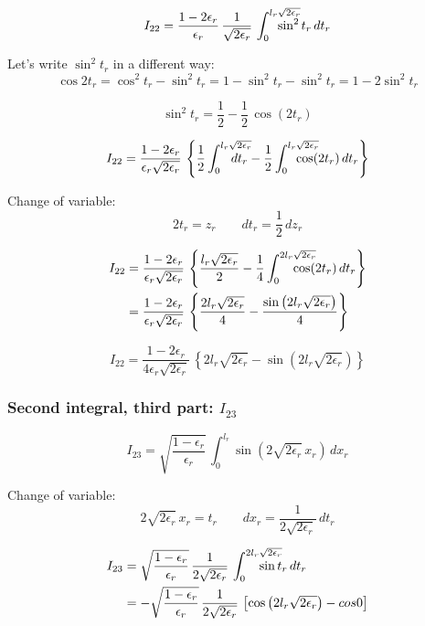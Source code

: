 \[
I_{22}
= 
\frac{1-2\epsilon_r}{\epsilon_r}\,
\frac{1}{\sqrt{2\epsilon_r}}\,
\int_{0}^{l_r\sqrt{2\epsilon_r}}\hspace*{-2em}\sin^2 t_r\, dt_r
\]

Let's write $\sin^2 t_r$ in a different way:
\[
\cos 2t_r = \cos^2 t_r - \sin^2 t_r = 1-\sin^2 t_r - \sin^2 t_r
= 1-2\sin^2 t_r
\]

\[
\sin^2 t_r = \frac{1}{2} - \frac{1}{2}\,\cos (2t_r)
\]

\[
I_{22}
= 
\frac{1-2\epsilon_r}{\epsilon_r\sqrt{2\epsilon_r}}\,
\left\lbrace
\frac{1}{2}\int_{0}^{l_r\sqrt{2\epsilon_r}}\hspace*{-2em}\,dt_r
- \frac{1}{2}\int_{0}^{l_r\sqrt{2\epsilon_r}}\hspace*{-2em}\cos(2t_r)\, dt_r
\right\rbrace
\]

Change of variable:
\[
2t_r = z_r
\hspace{2em}
dt_r = \frac{1}{2}\,dz_r
\]

\begin{align*}
I_{22}
&= 
\frac{1-2\epsilon_r}{\epsilon_r\sqrt{2\epsilon_r}}\,
\left\lbrace
\frac{l_r\sqrt{2\epsilon_r}}{2}
- \frac{1}{4}\int_{0}^{2l_r\sqrt{2\epsilon_r}}\hspace*{-2em}\cos(2t_r)\, dt_r
\right\rbrace\\
&= 
\frac{1-2\epsilon_r}{\epsilon_r\sqrt{2\epsilon_r}}\,
\left\lbrace
\frac{2l_r\sqrt{2\epsilon_r}}{4}
- \frac{\sin\left(2l_r\sqrt{2\epsilon_r}\right)}{4}
\right\rbrace
\end{align*}

\begin{equation}
\label{I22}
I_{22} =
\frac{1-2\epsilon_r}{4\epsilon_r\sqrt{2\epsilon_r}}\,
\left\lbrace
2l_r\sqrt{2\epsilon_r}
- \sin\left(2l_r\sqrt{2\epsilon_r}\right)
\right\rbrace
\end{equation}

\subsubsection{Second integral, third part: $I_{23}$}

\[
I_{23}
= 
\sqrt{\frac{1-\epsilon_r}{\epsilon_r}}\,
\int_{0}^{l_r}\sin\left(2\sqrt{2\epsilon_r}\,x_r\right)\, dx_r
\]

Change of variable:
\[
2\sqrt{2\epsilon_r}\,x_r = t_r
\hspace{2em}
dx_r = \frac{1}{2\sqrt{2\epsilon_r}}\,dt_r
\]

\begin{align*}
I_{23}
&= 
\sqrt{\frac{1-\epsilon_r}{\epsilon_r}}\,
\frac{1}{2\sqrt{2\epsilon_r}}\,
\int_{0}^{2l_r\sqrt{2\epsilon_r}}\hspace*{-2em}\sin t_r\, dt_r\\
&= 
-\sqrt{\frac{1-\epsilon_r}{\epsilon_r}}\,
\frac{1}{2\sqrt{2\epsilon_r}}\,
\left[\cos\left(2l_r\sqrt{2\epsilon_r}\right) - cos 0\right]
\end{align*}

